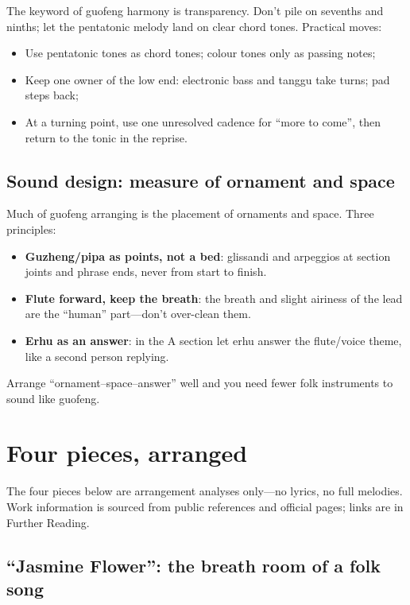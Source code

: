 The keyword of guofeng harmony is transparency. Don't pile on sevenths and ninths; let the pentatonic melody land on clear chord tones. Practical moves:

\begin{itemize}
\item Use pentatonic tones as chord tones; colour tones only as passing notes;
\item Keep one owner of the low end: electronic bass and tanggu take turns; pad steps back;
\item At a turning point, use one unresolved cadence for ``more to come'', then return to the tonic in the reprise.
\end{itemize}

\subsection{Sound design: measure of ornament and space}
\label{sec:guofeng-sound}

Much of guofeng arranging is the placement of ornaments and space. Three principles:

\begin{itemize}
\item \textbf{Guzheng/pipa as points, not a bed}: glissandi and arpeggios at section joints and phrase ends, never from start to finish.
\item \textbf{Flute forward, keep the breath}: the breath and slight airiness of the lead are the ``human'' part---don't over-clean them.
\item \textbf{Erhu as an answer}: in the A section let erhu answer the flute/voice theme, like a second person replying.
\end{itemize}

Arrange ``ornament--space--answer'' well and you need fewer folk instruments to sound like guofeng.

\section{Four pieces, arranged}
\label{sec:guofeng-cases}

The four pieces below are arrangement analyses only---no lyrics, no full melodies. Work information is sourced from public references and official pages; links are in Further Reading.

\subsection{``Jasmine Flower'': the breath room of a folk song}
\label{sec:guofeng-case-jasmine}

